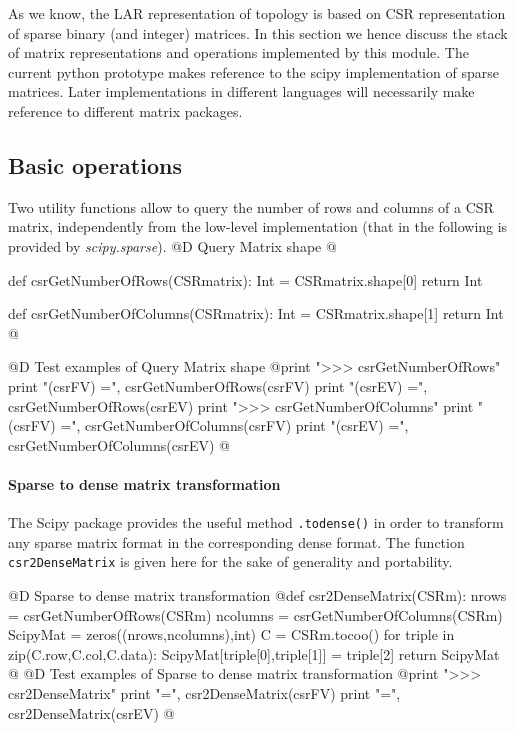 \documentclass[11pt,oneside]{article}	%
\begin{document}
As we know, the LAR representation of topology is based on CSR representation of sparse binary (and integer) matrices. In this section we hence discuss the stack of matrix representations and operations implemented by this module.  The current python prototype makes reference to the scipy implementation of sparse matrices. Later implementations in different languages will necessarily make reference to different matrix packages.


\subsection{Basic operations}

Two utility functions allow to query the number of rows and columns of a CSR matrix, independently from the low-level implementation (that in the following is provided by \emph{scipy.sparse}).
@D Query Matrix shape
@{def csrGetNumberOfRows(CSRmatrix):
	Int = CSRmatrix.shape[0]
	return Int
	
def csrGetNumberOfColumns(CSRmatrix):
	Int = CSRmatrix.shape[1]
	return Int
@}
@D Test examples of Query Matrix shape
@{print "\n>>> csrGetNumberOfRows"
print "\ncsrGetNumberOfRows(csrFV) =", csrGetNumberOfRows(csrFV)
print "\ncsrGetNumberOfRows(csrEV) =", csrGetNumberOfRows(csrEV)
print "\n>>> csrGetNumberOfColumns"
print "\ncsrGetNumberOfColumns(csrFV) =", csrGetNumberOfColumns(csrFV)
print "\ncsrGetNumberOfColumns(csrEV) =", csrGetNumberOfColumns(csrEV)
@}

\paragraph{Sparse to dense matrix transformation}
The Scipy package provides the useful method \texttt{.todense()} in order to transform any sparse matrix format in the corresponding dense format. The function \texttt{csr2DenseMatrix} is given here for the sake of generality and portability.

@D Sparse to dense matrix transformation
@{def csr2DenseMatrix(CSRm):
	nrows = csrGetNumberOfRows(CSRm)
	ncolumns = csrGetNumberOfColumns(CSRm)
	ScipyMat = zeros((nrows,ncolumns),int)
	C = CSRm.tocoo()
	for triple in zip(C.row,C.col,C.data):
		ScipyMat[triple[0],triple[1]] = triple[2]
	return ScipyMat
@}
@D Test examples of Sparse to dense matrix transformation
@{print "\n>>> csr2DenseMatrix"
print "\nFV =\n", csr2DenseMatrix(csrFV)
print "\nEV =\n", csr2DenseMatrix(csrEV)
@}
\end{document}
